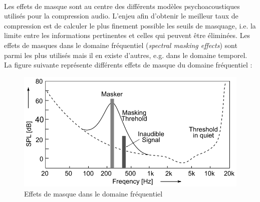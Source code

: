 \documentclass{article}
\begin{document}
    \paragraph{}
    Les effets de masque sont au centre des différents modèles psychoacoustiques utilisés pour la compression audio. L'enjeu afin d'obtenir le meilleur taux de compression est de calculer le plus finement possible les seuils de masquage, i.e. la limite entre les informations pertinentes et celles qui peuvent être éliminées. Les effets de masques dans le domaine fréquentiel (\emph{spectral masking effects}) sont parmi les plus utilisés mais il en existe d'autres, e.g. dans le domaine temporel. La figure suivante représente différents effets de masque du domaine fréquentiel :
    \begin{figure}[H]
        \centering
        \includegraphics[width=.6\linewidth]{./images/2019-Herre-Dick-masking-effect.png}
        \caption{Effets de masque dans le domaine fréquentiel}
    \end{figure}

\end{document}
